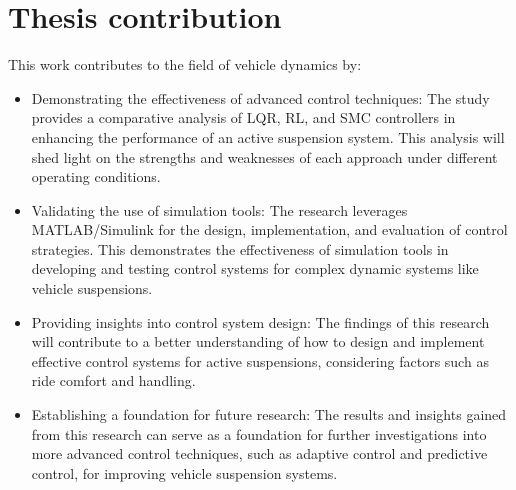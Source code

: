 \section{Thesis contribution}
This work contributes to the field of vehicle dynamics by:

	\begin{itemize}
		\item Demonstrating the effectiveness of advanced control techniques: The study provides a comparative analysis of LQR, RL, and SMC controllers in enhancing the performance of an active suspension system. This analysis will shed light on the strengths and weaknesses of each approach under different operating conditions.

		\item Validating the use of simulation tools: The research leverages MATLAB/Simulink for the design, implementation, and evaluation of control strategies. This demonstrates the effectiveness of simulation tools in developing and testing control systems for complex dynamic systems like vehicle suspensions.

		\item Providing insights into control system design: The findings of this research will contribute to a better understanding of how to design and implement effective control systems for active suspensions, considering factors such as ride comfort and handling.

		\item Establishing a foundation for future research: The results and insights gained from this research can serve as a foundation for further investigations into more advanced control techniques, such as adaptive control and predictive control, for improving vehicle suspension systems.
	\end{itemize}

